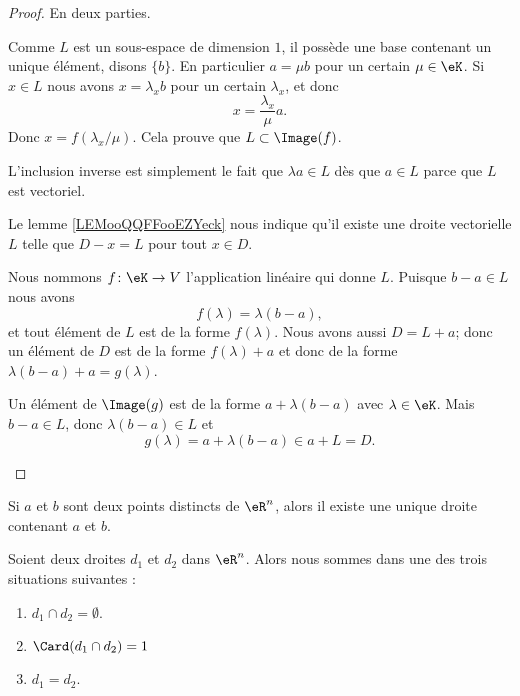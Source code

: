 \begin{proof}
	En deux parties.
	\begin{subproof}
		Comme \( L\) est un sous-espace de dimension \( 1\), il possède une base contenant un unique élément, disons \( \{ b \}\). En particulier \( a=\mu b\) pour un certain \( \mu\in \eK\). Si \( x\in L\) nous avons \( x=\lambda_x b\) pour un certain \( \lambda_x\), et donc
		\begin{equation}
			x=\frac{ \lambda_x }{ \mu }a.
		\end{equation}
		Donc \( x=f(\lambda_x/\mu)\). Cela prouve que \( L\subset\Image(f)\).

		L'inclusion inverse est simplement le fait que \( \lambda a\in L\) dès que \( a\in L\) parce que \( L\) est vectoriel.

		Le lemme \ref{LEMooQQFFooEZYeck} nous indique qu'il existe une droite vectorielle \( L\) telle que \( D-x=L\) pour tout \( x\in D\).
		\begin{subproof}
			Nous nommons \( f\colon \eK\to V\) l'application linéaire qui donne \( L\). Puisque \( b-a\in L\) nous avons
			\begin{equation}
				f(\lambda)=\lambda(b-a),
			\end{equation}
			et tout élément de \( L\) est de la forme \( f(\lambda)\). Nous avons aussi \( D=L+a\); donc un élément de \( D\) est de la forme \( f(\lambda)+a\) et donc de la forme \( \lambda(b-a)+a=g(\lambda)\).

			Un élément de \( \Image(g)\) est de la forme \( a+\lambda(b-a)\) avec \( \lambda\in \eK\). Mais \( b-a\in L\), donc \( \lambda(b-a)\in L\) et
			\begin{equation}
				g(\lambda)=a+\lambda(b-a)\in a+L=D.
			\end{equation}
		\end{subproof}
	\end{subproof}
\end{proof}

\begin{proposition}     \label{PROPooRSKLooVrxrFz}
    Si \( a\) et \( b\) sont deux points distincts de \( \eR^n\), alors il existe une unique droite contenant \( a\) et \( b\).
\end{proposition}

\begin{proposition}     \label{PROPooTFTJooJejuBU}
    Soient deux droites \( d_1\) et \( d_2\) dans \( \eR^n\). Alors nous sommes dans une des trois situations suivantes :
    \begin{enumerate}
        \item
            \( d_1\cap d_2=\emptyset\).
        \item
            \( \Card(d_1\cap d_2)=1\)
        \item
            \( d_1=d_2\).
    \end{enumerate}
\end{proposition}

